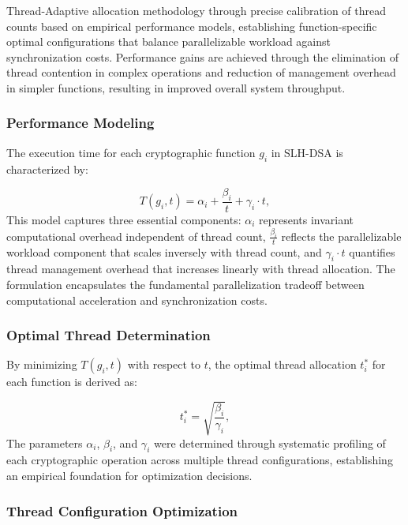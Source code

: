 \documentclass[journal]{IEEEtran}
\begin{document}
Thread-Adaptive allocation methodology through precise calibration of thread counts based on empirical performance models, establishing function-specific optimal configurations that balance parallelizable workload against synchronization costs. Performance gains are achieved through the elimination of thread contention in complex operations and reduction of management overhead in simpler functions, resulting in improved overall system throughput.

\subsubsection{Performance Modeling}

The execution time for each cryptographic function $g_i$ in SLH-DSA is characterized by:

\begin{equation}
  \label{eq:execution_time_model}
  T(g_i, t) = \alpha_i + \frac{\beta_i}{t} + \gamma_i \cdot t,
\end{equation}
This model captures three essential components: $\alpha_i$ represents invariant computational overhead independent of thread count, $\frac{\beta_i}{t}$ reflects the parallelizable workload component that scales inversely with thread count, and $\gamma_i \cdot t$ quantifies thread management overhead that increases linearly with thread allocation. The formulation encapsulates the fundamental parallelization tradeoff between computational acceleration and synchronization costs.

\subsubsection{Optimal Thread Determination}

By minimizing $T(g_i, t)$ with respect to $t$, the optimal thread allocation $t_i^*$ for each function is derived as:

\begin{equation}
  \label{eq:optimal_thread_count}
  t_i^* = \sqrt{\frac{\beta_i}{\gamma_i}},
\end{equation}
The parameters $\alpha_i$, $\beta_i$, and $\gamma_i$ were determined through systematic profiling of each cryptographic operation across multiple thread configurations, establishing an empirical foundation for optimization decisions.

\subsubsection{Thread Configuration Optimization}
\end{document}
